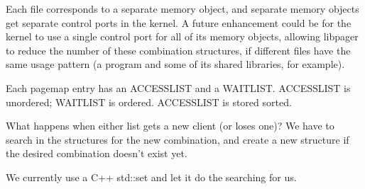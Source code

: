 \documentclass{article}
\begin{document}
Each file corresponds to a separate memory object, and separate memory
objects get separate control ports in the kernel.  A future
enhancement could be for the kernel to use a single control port for
all of its memory objects, allowing libpager to reduce the number of
these combination structures, if different files have the same usage
pattern (a program and some of its shared libraries, for example).

Each pagemap entry has an ACCESSLIST and a WAITLIST.  ACCESSLIST is
unordered; WAITLIST is ordered.  ACCESSLIST is stored sorted.

What happens when either list gets a new client (or loses one)?  We
have to search in the structures for the new combination, and create a
new structure if the desired combination doesn't exist yet.

We currently use a C++ std::set and let it do the searching for us.
\end{document}
